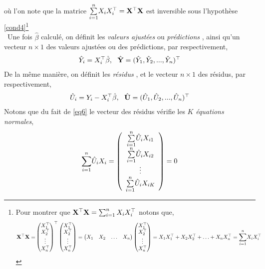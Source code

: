 où l'on note que la matrice $\underset{i=1}{\overset{n}{\sum}} X_iX_i^\top = \mathbf X^\top\mathbf X$ est inversible sous l'hypothèse \eqref{cond4}\footnote{Pour montrer que 
$\mathbf X^\top\mathbf X = \sum_{i=1}^n X_iX_i^\top$ notons que,
\begin{align*}
\mathbf X^\top\mathbf X=&
\begin{pmatrix}
X_1^\top\\
X_2^\top\\
\vdots\\
X_n^\top
\end{pmatrix}^\top
\begin{pmatrix}
X_1^\top\\
X_2^\top\\
\vdots\\
X_n^\top
\end{pmatrix}
= 
\begin{pmatrix}
X_1&X_2&\ldots&X_n
\end{pmatrix}
\begin{pmatrix}
X_1^\top\\
X_2^\top\\
\vdots\\
X_n^\top
\end{pmatrix}
= X_1X_1^\top + X_2X_2^\top+\ldots+X_nX_n^\top
=\underset{i=1}{\overset{n}{\sum}} X_iX_i^\top
\end{align*}

}\\\
Une fois $\hat{\beta}$ calculé, on définit les \emph{valeurs ajustées} ou \emph{prédictions} , ainsi qu'un vecteur $n\times 1$ des valeurs ajustées ou des prédictions, par respectivement,
\begin{align*}
\hat{Y}_i = X_i^\top\hat{\beta}, \ \ \hat{\mathbf Y} = (\hat{Y}_1,  \hat{Y}_2,..., \hat{Y}_n)^\top
\end{align*}
De la même manière, on définit  les \emph{résidus}  , et le vecteur  $n\times 1$ des résidus, par respectivement,
\begin{align*}
\hat{U}_i = Y_i - X_i^\top\hat{\beta}, \ \ \hat{\mathbf U} = (\hat{U}_1, \hat{U}_2,...,\hat{U}_n)^\top
\end{align*}
Notons que du fait de \eqref{eq6} le vecteur des résidus vérifie les $K$  \emph{équations normales},
\begin{align}
 \underset{i=1}{\overset{n}{\sum}}\hat{U}_iX_i=
\left(
\begin{array}{c}
\underset{i=1}{\overset{n}{\sum}}\hat{U}_iX_{i1}\\
\underset{i=1}{\overset{n}{\sum}}\hat{U}_iX_{i2}\\
\vdots\\
\underset{i=1}{\overset{n}{\sum}}\hat{U}_iX_{iK}
\end{array}
\right)
=0
\label{eq10}
\end{align}
